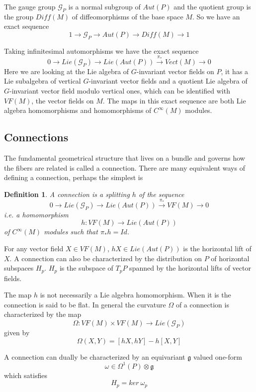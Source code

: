 \documentclass[a4paper,a4paper]{article}
\newtheorem{define}{Definition}
\theoremstyle{conjecture}
\begin{document}
The gauge group ${\mathcal G}_P$ is a normal subgroup of $Aut(P)$ and the
quotient group is the group $Diff(M)$ of diffeomorphisms of the base space $M$.  So we have an exact sequence 
$$1\rightarrow {\mathcal G}_P\rightarrow Aut(P)\rightarrow Diff(M)\rightarrow 1$$

Taking infinitesimal automorphisms we have the exact sequence
$$0\rightarrow Lie ({\mathcal G}_P)\rightarrow Lie(Aut(P))\stackrel{\pi_*}\rightarrow Vect(M)\rightarrow 0$$
Here we are looking at the Lie algebra of $G$-invariant vector fields
on $P$, it has a Lie subalgebra of vertical $G$-invariant vector fields and a quotient Lie algebra of $G$-invariant vector field modulo vertical
ones, which can be identified with $VF(M)$, the vector fields on $M$.  The maps in this exact sequence
are both Lie algebra homomorphisms and homomorphisms of $C^\infty(M)$ modules.


\subsection {Connections}

The fundamental geometrical structure that lives on a bundle and governs how the fibers are related is called a connection.  
There are many equivalent ways of defining a connection, perhaps the simplest is

\begin{define}
A connection is a splitting $h$ of the sequence
$$0\rightarrow Lie ({\mathcal G}_P)\rightarrow Lie(Aut(P))\stackrel{\pi_*}\rightarrow VF(M)\rightarrow 0$$
i.e. a homomorphism 
$$h:VF(M)\rightarrow  Lie(Aut(P))$$
of $C^\infty(M)$ modules such that $\pi_* h=Id$.
\end{define}

For any vector field $X\in VF(M)$, $hX \in  Lie(Aut(P))$ is the horizontal lift of $X$.  A connection can
also be characterized by the distribution on $P$ of horizontal subspaces $H_p$. $H_p$ is the subspace of
$T_pP$ spanned by the horizontal lifts of vector fields.

The map $h$ is not necessarily a Lie algebra homomorphism.  When it is the connection is said to be flat. In
general the curvature $\Omega$ of a connection is characterized by the map
$$\Omega :VF(M)\times VF(M) \rightarrow Lie ({\mathcal G}_P)$$
given by
$$\Omega (X,Y)=[hX,hY]-h[X,Y]$$

A connection can dually be characterized by an equivariant $\mathfrak g$ valued one-form 
$$\omega \in \Omega^1(P)\otimes\mathfrak g$$
which satisfies
$$H_p=ker \ \omega _p$$
\end{document}
